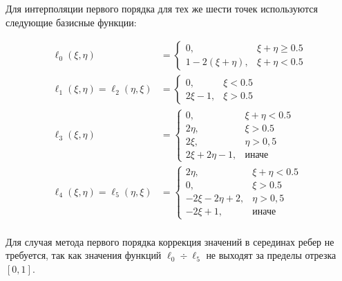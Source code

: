 Для интерполяции первого порядка для тех же шести точек используются следующие базисные функции:

\begin {equation}
\begin {aligned}
\ell_0 (\xi, \eta) &= 
\begin{cases}
0, & \xi + \eta \geqslant 0.5 \\
1-2(\xi + \eta), & \xi + \eta < 0.5
\end{cases}
 \\
\ell_1 (\xi, \eta) = \ell_2 (\eta, \xi) &= 
\begin{cases}
0, & \xi < 0.5 \\
2\xi - 1, & \xi > 0.5
\end{cases}
\\
\ell_3 (\xi, \eta) &=
\begin{cases}
0, & \xi + \eta < 0.5 \\
2\eta, & \xi > 0.5 \\
2\xi, &\eta > 0,5 \\
2\xi + 2\eta - 1, & \text{иначе}
\end{cases}
\\
\ell_4 (\xi, \eta) = \ell_5(\eta, \xi)&= 
\begin{cases}
2\eta, & \xi + \eta < 0.5 \\
0, & \xi > 0.5 \\
-2\xi -2\eta + 2, &\eta > 0,5 \\
-2\xi + 1, & \text{иначе}
\end{cases}
\\
\end {aligned}
\end {equation}

Для случая метода первого порядка коррекция значений в серединах ребер не требуется, так как значения функций $\ell_0 \div \ell_5$ не выходят за пределы отрезка $[0, 1]$.